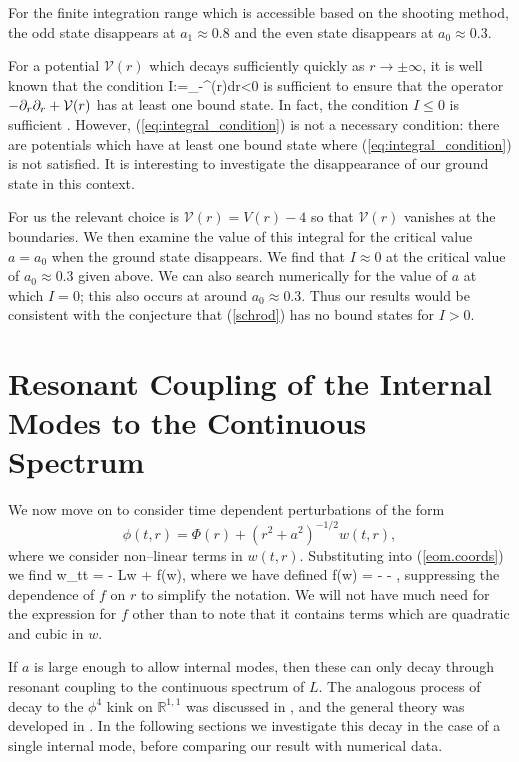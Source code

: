 For the finite integration range which is accessible based on the shooting method, the odd state disappears at $a_1 \approx 0.8$ and the even state disappears at $a_0 \approx 0.3$.

For a potential $\mathcal{V}(r)$ which decays sufficiently quickly as $r\rightarrow\pm\infty$, it is well known that the condition
\be
\label{eq:integral_condition}
I:=\int_{-\infty}^{\infty}(r)dr<0
\ee
is sufficient to ensure that the operator $-\partial_r\partial_r + \mathcal{V}(r)$ has at least one bound state. In fact, the condition $I\leq 0$ is sufficient \cite{BarrySimon}. However, (\ref{eq:integral_condition}) is not a necessary condition: there are potentials which have at least one bound state where (\ref{eq:integral_condition}) is not satisfied. It is interesting to investigate the disappearance of our ground state in this context.

For us the relevant choice is $\mathcal{V}(r)=V(r)-4$ so that $\mathcal{V}(r)$ vanishes at the boundaries. We then examine the value of this integral for the critical value $a=a_0$ when the ground state disappears. We find that $I\approx0$ at the critical value of $a_0 \approx 0.3$ given above. We can also search numerically for the value of $a$ at which $I=0$; this also occurs at around $a_0 \approx 0.3$. Thus our results would be consistent with the conjecture that (\ref{schrod}) has no bound states for $I>0$.

\section{Resonant Coupling of the Internal Modes to the Continuous Spectrum} \label{sec:dynamics}
We now move on to consider time dependent perturbations of the form
\[
\phi(t,r) = \Phi(r) + (r^2+a^2)^{-1/2}w(t,r),
\]
where we consider non--linear terms in $w(t,r)$. Substituting into (\ref{eom.coords}) we find
\be
\label{eq:nonsmall_pert}
w_{tt} = - Lw + f(w),
\ee
where we have defined
\be \label{eq:f}
f(w) = -  - ,
\ee
suppressing the dependence of $f$ on $r$ to simplify the notation. We will not have much need for the expression for $f$ other than to note that it contains terms which are quadratic and cubic in $w$.

If $a$ is large enough to allow internal modes, then these can only decay through resonant coupling to the continuous spectrum of $L$. The analogous process of decay to the $\phi^4$ kink on $\mathbb{R}^{1,1}$ was discussed in \cite{Manton&Merabet}, and the general theory was developed in \cite{SW98}. In the following sections we investigate this decay in the case of a single internal mode, before comparing our result with numerical data.

